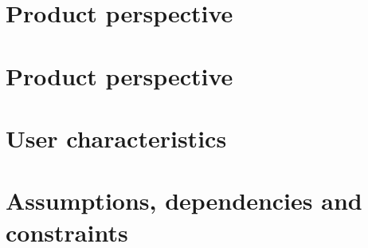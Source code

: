 \section{Product perspective}
\label{s:Product_perspective}%


\section{Product perspective}
\label{s:Product_functions}%

\section{User characteristics}
\label{s:User_characteristics}%


\section{Assumptions, dependencies and constraints}
\label{s:Assumptions_dependencies_and_constraints}%


